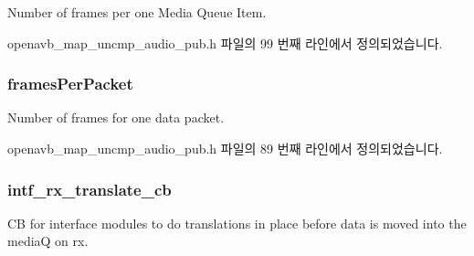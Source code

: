 Number of frames per one Media Queue Item. 



openavb\+\_\+map\+\_\+uncmp\+\_\+audio\+\_\+pub.\+h 파일의 99 번째 라인에서 정의되었습니다.

\subsubsection[{\texorpdfstring{frames\+Per\+Packet}{framesPerPacket}}]{ frames\+Per\+Packet}\hypertarget{structmedia__q__pub__map__uncmp__audio__info__t_a6fa8730e8997aa6d9cf63a467e0c23ee}{}\label{structmedia__q__pub__map__uncmp__audio__info__t_a6fa8730e8997aa6d9cf63a467e0c23ee}


Number of frames for one data packet. 



openavb\+\_\+map\+\_\+uncmp\+\_\+audio\+\_\+pub.\+h 파일의 89 번째 라인에서 정의되었습니다.

\subsubsection[{\texorpdfstring{intf\+\_\+rx\+\_\+translate\+\_\+cb}{intf_rx_translate_cb}}]{ intf\+\_\+rx\+\_\+translate\+\_\+cb}\hypertarget{structmedia__q__pub__map__uncmp__audio__info__t_a91c52495b5f10c5c17d4f1406f4d963b}{}\label{structmedia__q__pub__map__uncmp__audio__info__t_a91c52495b5f10c5c17d4f1406f4d963b}


CB for interface modules to do translations in place before data is moved into the mediaQ on rx. 




